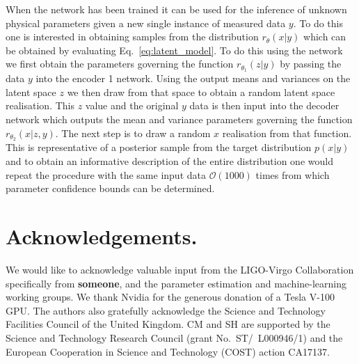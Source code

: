 \documentclass[%
showpacs,
 amsmath,amssymb,
 aps,
 twocolumn,
 prl,
 reprint,
floatfix,
]{revtex4-1}
\begin{document}
When the network has been trained it can be used for the inference of unknown
physical parameters given a new single instance of measured data $y$. To do
this one is interested in obtaining samples from the distribution
$r_{\theta}(x|y)$ which can be obtained by evaluating
Eq.~\ref{eq:latent_model}. To do this using the network we first obtain the
parameters governing the function $r_{\theta_{1}}(z|y)$ by passing the data $y$
into the encoder 1 network. Using the output means and variances on the latent space
$z$ we then draw from that space to obtain a random latent space realisation.
This $z$ value and the original $y$ data is then input into the decoder network
which outputs the mean and variance parameters governing the function
$r_{\theta_{2}}(x|z,y)$. The next step is to draw a random $x$ realisation from
that function. This is representative of a posterior sample from the target
distribution $p(x|y)$ and to obtain an informative description of the entire
distribution one would repeat the procedure with the same input data
$\mathcal{O}(1000)$ times from which parameter confidence bounds can be
determined.      


%
%
\section{Acknowledgements.}
%
We would like to acknowledge valuable input from the LIGO-Virgo Collaboration
specifically from {\textbf{someone}}, and the parameter estimation and
machine-learning working groups. We thank Nvidia for the generous 
donation of a Tesla V-100 GPU. The authors also gratefully acknowledge the
Science and Technology Facilities Council of the United Kingdom. CM and SH are
supported by the Science and Technology Research Council (grant
No.~ST/~L000946/1) and the European Cooperation in Science and Technology
(COST) action CA17137.




\end{document}

